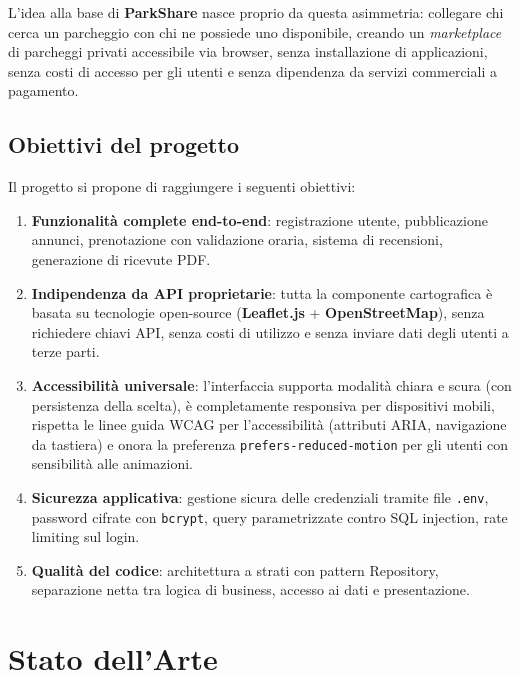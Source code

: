 \documentclass[12pt, a4paper]{article}
\begin{document}
L'idea alla base di \textbf{ParkShare} nasce proprio da questa asimmetria: collegare chi cerca
un parcheggio con chi ne possiede uno disponibile, creando un \emph{marketplace} di parcheggi
privati accessibile via browser, senza installazione di applicazioni, senza costi di accesso per
gli utenti e senza dipendenza da servizi commerciali a pagamento.

\subsection{Obiettivi del progetto}

Il progetto si propone di raggiungere i seguenti obiettivi:

\begin{enumerate}[leftmargin=*, label=\textbf{\arabic*.}]
    \item \textbf{Funzionalità complete end-to-end}: registrazione utente, pubblicazione
    annunci, prenotazione con validazione oraria, sistema di recensioni, generazione di
    ricevute PDF.

    \item \textbf{Indipendenza da API proprietarie}: tutta la componente cartografica è
    basata su tecnologie open-source (\textbf{Leaflet.js} + \textbf{OpenStreetMap}), senza
    richiedere chiavi API, senza costi di utilizzo e senza inviare dati degli utenti a
    terze parti.

    \item \textbf{Accessibilità universale}: l'interfaccia supporta modalità chiara e scura
    (con persistenza della scelta), è completamente responsiva per dispositivi mobili,
    rispetta le linee guida WCAG per l'accessibilità (attributi ARIA, navigazione da
    tastiera) e onora la preferenza \texttt{prefers-reduced-motion} per gli utenti con
    sensibilità alle animazioni.

    \item \textbf{Sicurezza applicativa}: gestione sicura delle credenziali tramite file
    \texttt{.env}, password cifrate con \texttt{bcrypt}, query parametrizzate contro
    SQL injection, rate limiting sul login.

    \item \textbf{Qualità del codice}: architettura a strati con pattern Repository,
    separazione netta tra logica di business, accesso ai dati e presentazione.
\end{enumerate}


\section{Stato dell'Arte}
\label{sec:sota}
\end{document}
